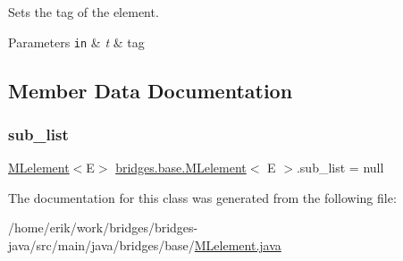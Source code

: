 Sets the tag of the element.


\begin{DoxyParams}[1]{Parameters}
\mbox{\tt in}  & {\em t} & tag \\
\hline
\end{DoxyParams}


\subsection{Member Data Documentation}
\mbox{\label{classbridges_1_1base_1_1_m_lelement_a7dee2985f9a8134d3076eb9478422403}} 
\subsubsection{\texorpdfstring{sub\+\_\+list}{sub\_list}}
{\footnotesize\ttfamily \hyperlink{classbridges_1_1base_1_1_m_lelement}{M\+Lelement}$<$E$>$ \hyperlink{classbridges_1_1base_1_1_m_lelement}{bridges.\+base.\+M\+Lelement}$<$ E $>$.sub\+\_\+list = null\hspace{0.3cm}{\ttfamily [protected]}}



The documentation for this class was generated from the following file\+:\begin{DoxyCompactItemize}
\item 
/home/erik/work/bridges/bridges-\/java/src/main/java/bridges/base/\hyperlink{_m_lelement_8java}{M\+Lelement.\+java}\end{DoxyCompactItemize}
